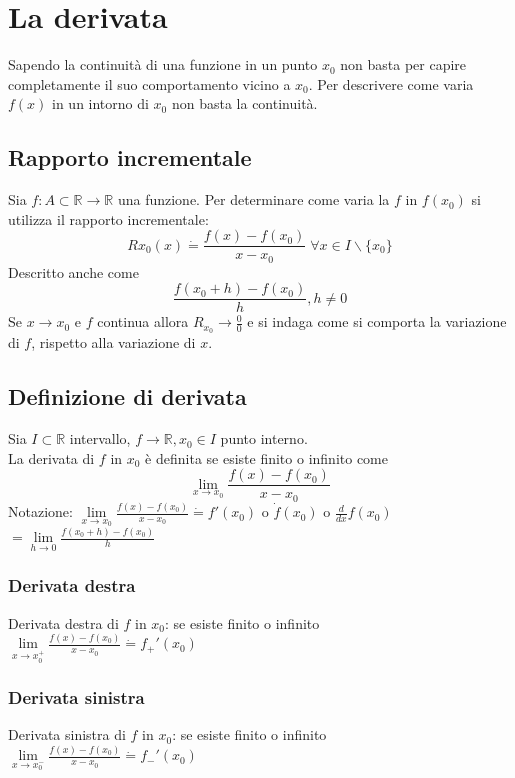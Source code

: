 \chapter{La derivata}
Sapendo la continuit\`a di una funzione in un punto $x_0$ non basta per capire completamente il suo comportamento vicino a $x_0$. Per descrivere come varia $f(x)$ in un intorno
di $x_0$ non basta la continuit\`a.
\section{Rapporto incrementale}
Sia $f:A\subset\mathbb{R}\rightarrow\mathbb{R}$ una funzione. Per determinare come varia la $f$ in $f(x_0)$ si utilizza il rapporto incrementale:
\begin{equation}
R{x_0}(x)\dot{=}\frac{f(x)-f(x_0)}{x-x_0}\;\forall x\in I\backslash\{x_0\}
\end{equation}
Descritto anche come 
\begin{equation}
\frac{f(x_0+h)-f(x_0)}{h}, h\neq0
\end{equation}
Se $x\rightarrow x_0$ e $f$ continua allora $R_{x_0}\rightarrow \frac{0}{0}$ e si indaga come si comporta la variazione di $f$, rispetto alla variazione di $x$.
\section{Definizione di derivata}
Sia $I\subset\mathbb{R}$ intervallo, $f\rightarrow\mathbb{R},x_0\in I$ punto interno.\\
La derivata di $f$ in $x_0$ \`e definita se esiste finito o infinito come 
\begin{equation}
\lim\limits_{x\rightarrow x_0}\frac{f(x)-f(x_0)}{x-x_0}
\end{equation}
Notazione: $\lim\limits_{x\rightarrow x_0}\frac{f(x)-f(x_0)}{x-x_0}\dot{=} f'(x_0)$ o $\dot{f}(x_0)$ o $\frac{d}{dx}f(x_0)$ $=\lim\limits_{h\rightarrow 0}\frac{f(x_0+h)-f(x_0)}{h}
$
\subsection{Derivata destra}
Derivata destra di $f$ in $x_0$: se esiste finito o infinito $\lim\limits_{x\rightarrow x_0^+}\frac{f(x)-f(x_0)}{x-x_0}\dot{=} f_+'(x_0)$
\subsection{Derivata sinistra}
Derivata sinistra di $f$ in $x_0$: se esiste finito o infinito $\lim\limits_{x\rightarrow x_0^-}\frac{f(x)-f(x_0)}{x-x_0}\dot{=} f_-'(x_0)$
